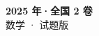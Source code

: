 \documentclass[zihao=-4, a4paper]{ctexart}
\begin{document}
\begin{center}
  {\Large\bfseries 2025 年·全国 2 卷}\\[4pt]
  {\large 数学 · 试题版}
\end{center}
\medskip
{}

\end{document}
